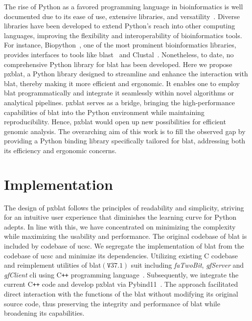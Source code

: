 The rise of Python as a favored programming language in bioinformatics is well documented due to its ease of use, extensive libraries, and versatility~\citep{perkel2015programming}.
Diverse libraries have been developed to extend Python's reach into other computing languages, improving the flexibility and interoperability of bioinformatics tools.
For instance, Biopython~\citep{cock2009biopython}, one of the most prominent bioinformatics libraries, provides interfaces to tools like \gls{blast}~\citep{altschul1990basic} and Clustal~\citep{higgins1988clustal}.
Nonetheless, to date, no comprehensive Python library for \gls{blat} has been developed.
Here we propose \gls{pxblat}, a Python library designed to streamline and enhance the interaction with \gls{blat}, thereby making it more efficient and ergonomic.
It enables one to employ \gls{blat} programmatically and integrate it  seamlessly within novel algorithms or analytical pipelines.
\gls{pxblat} serves as a bridge, bringing the high-performance capabilities of \gls{blat} into the Python environment while maintaining reproducibility.
Hence, \gls{pxblat} would open up new possibilities for efficient genomic analysis.
The overarching aim of this work is to fill the observed gap by providing a Python binding library specifically tailored for \gls{blat}, addressing both its efficiency and ergonomic concerns.

\section*{Implementation}\label{sec:implementation}

The design of \gls{pxblat} follows the principles of readability and simplicity, striving for an intuitive user experience that diminishes the learning curve for Python adepts.
In line with this, we have concentrated on minimizing the complexity while maximizing the usability and performance.
The original codebase of \gls{blat} is included by codebase of \gls{ucsc}.
We segregate the implementation of \gls{blat} from the codebase of \gls{ucsc} and minimize its dependencies.
Utilizing existing C codebase and reimplement utilities of \gls{blat}\(\left(\mathtt{V}37.1\right)\) suit  including \emph{faTwoBit}, \emph{gfServer} and \emph{gfClient} \gls{cli} using C\texttt{++} programming language~\citep{kent2002blat}.
Subsequently, we integrate the current C\texttt{++} code and develop \gls{pxblat} via Pybind11~\citep{pybind11}.
The approach facilitated direct interaction with the functions of the \gls{blat} without modifying its original source code, thus preserving the integrity and performance of \gls{blat} while broadening its capabilities.

